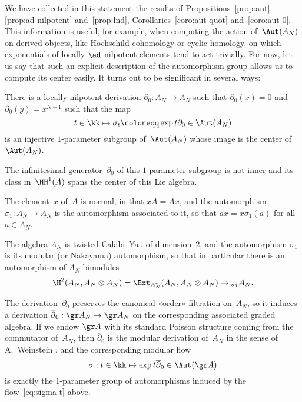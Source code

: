 We have collected in this statement the results of
Propositions~\ref{prop:aut}, \ref{prop:ad-nilpotent} and~\ref{prop:lnd},
Corollaries~\ref{coro:aut-quot} and~\ref{coro:aut-0}. This information is
useful, for example, when computing the action of~$\Aut(A_N)$ on derived
objects, like Hochschild cohomology or cyclic homology, on which
exponentials of locally $\ad$-nilpotent elements tend to act trivially. For
now, let us say that such an explicit description of the automorphism group
allows us to compute its center easily. It turns out to be significant in
several ways:

\begin{Theorem}
There is a locally nilpotent derivation $\partial_0:A_N\to A_N$ such that
$\partial_0(x)=0$ and $\partial_0(y)=x^{N-1}$ such that the map
  \[ \label{eq:sigma-t}
  t \in \kk \mapsto \sigma_t\coloneqq\exp t\partial_0 \in\Aut(A_N)
  \]
is an injective $1$-parameter subgroup of~$\Aut(A_N)$ whose image is the
center of~$\Aut(A_N)$. 
\begin{thmlist}

\item The infinitesimal generator~$\partial_0$ of this $1$-parameter
subgroup is not inner and its class in~$\HH^1(A)$ spans the center of this
Lie algebra.

\item The element~$x$ of~$A$ is normal, in that $xA=Ax$, and the
automorphism $\sigma_1:A_N\to A_N$ is the automorphism associated to it, so
that $ax=x\sigma_1(a)$ for all $a\in A_N$.

\item The algebra $A_N$ is twisted Calabi--Yau of dimension~$2$, and the
automorphism $\sigma_1$ is its modular (or Nakayama) automorphism, so that in particular
there is an automorphism of $A_N$-bimodules
  \[
  \H^2(A_N,A_N\otimes A_N)
        = \Ext_{A_N^e}(A_N,A_N\otimes A_N)
        \to {}_{\sigma_1}A_N.
  \]

\item The derivation~$\partial_0$ preserves the canonical «order» filtration
on~$A_N$, so it induces a derivation $\overline\partial_0:\gr A_N\to\gr
A_N$ on the corresponding associated graded algebra. If we endow $\gr A$
with its standard Poisson structure coming from the commutator of~$A_N$,
then $\overline\partial_0$ is the modular derivation of~$A_N$ in the sense
of A.~Weinstein \cite{Weinstein}, and the corresponding modular flow
  \[
  \sigma:t\in\kk\mapsto\exp t\overline\partial_0\in\Aut(\gr A)
  \]
is exactly the $1$-parameter group of automorphisms induced by the
flow~\eqref{eq:sigma-t} above.

\end{thmlist}
\end{Theorem}

